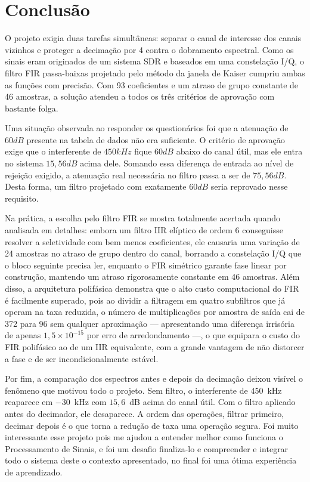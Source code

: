\chapter{Conclusão}
\label{cap:conclusao}

O projeto exigia duas tarefas simultâneas: separar o canal de interesse dos canais vizinhos e proteger a decimação por 4 contra o dobramento espectral. Como os sinais eram originados de um sistema SDR e baseados em uma constelação I/Q, o filtro FIR passa-baixas projetado pelo método da janela de Kaiser cumpriu ambas as funções com precisão. Com 93 coeficientes e um atraso de grupo constante de 46 amostras, a solução atendeu a todos os três critérios de aprovação com bastante folga.

Uma situação observada ao responder os questionários foi que a atenuação de $60 dB$ presente na tabela de dados não era suficiente. O critério de aprovação exige que o interferente de $450 kHz$ fique $60 dB$ abaixo do canal útil, mas ele entra no sistema $15,56 dB$ acima dele. Somando essa diferença de entrada ao nível de rejeição exigido, a atenuação real necessária no filtro passa a ser de $75,56 dB$. Desta forma, um filtro projetado com exatamente $60 dB$ seria reprovado nesse requisito.

Na prática, a escolha pelo filtro FIR se mostra totalmente acertada quando analisada em detalhes: embora um filtro IIR elíptico de ordem 6 conseguisse resolver a seletividade com bem menos coeficientes, ele causaria uma variação de 24 amostras no atraso de grupo dentro do canal, borrando a constelação I/Q que o bloco seguinte precisa ler, enquanto o FIR simétrico garante fase linear por construção, mantendo um atraso rigorosamente constante em 46 amostras. Além disso, a arquitetura polifásica demonstra que o alto custo computacional do FIR é facilmente superado, pois ao dividir a filtragem em quatro subfiltros que já operam na taxa reduzida, o número de multiplicações por amostra de saída cai de 372 para 96 sem qualquer aproximação — apresentando uma diferença irrisória de apenas $1{,}5 \times 10^{-15}$ por erro de arredondamento —, o que equipara o custo do FIR polifásico ao de um IIR equivalente, com a grande vantagem de não distorcer a fase e de ser incondicionalmente estável.

Por fim, a comparação dos espectros antes e depois da decimação deixou visível o fenômeno que motivou todo o projeto. Sem filtro, o interferente de $450$~kHz reaparece em $-30$~kHz com $15{,}6$~dB acima do canal útil. Com o filtro aplicado antes do decimador, ele desaparece. A ordem das operações, filtrar primeiro, decimar depois é o que torna a redução de taxa uma operação segura. Foi muito interessante esse projeto pois me ajudou a entender melhor como funciona o Processamento de Sinais, e foi um desafio finaliza-lo e compreender e integrar todo o sistema deste o contexto apresentado, no final foi uma ótima experiência de aprendizado.